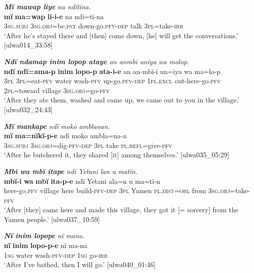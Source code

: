 \ea%
    \label{ex:complex:59}
          \textit{\textbf{Mï mawap liye} na ndïtïna.}\\
\gll    \textbf{mï}      \textbf{ma=wap}      \textbf{li-i-e}        na    ndï=tï-na\\
    3\textsc{sg.subj}  3\textsc{sg.obj}=be.\textsc{pst}  down-go.\textsc{pfv-dep}  talk  \textsc{3pl}=take-\textsc{irr}\\
\glt `After he’s stayed there and [then] come down, [he] will get the conversations.’ [ulwa014\_33:58]
\z

\ea%
    \label{ex:complex:60}
          \textit{\textbf{Ndï ndamap inim lopop ataye} an anmbi uniya wa molop.}\\
\gll    \textbf{ndï}  \textbf{ndï=ama-p}  \textbf{inim}  \textbf{lopo-p}    \textbf{ata-i-e}      an an-mbï-i      un=iya      wa    ma=lo-p\\
    3\textsc{pl}  3\textsc{pl}=eat-\textsc{pfv}  water  wash-\textsc{pfv}  up-go.\textsc{pfv-dep} \textsc{1pl.excl}    out-here-go.\textsc{pfv}  \textsc{2pl=}toward  village  3\textsc{sg.obj}=go-\textsc{pfv}\\
\glt `After they ate them, washed and came up, we came out to you in the village.’ [ulwa032\_24:43]
\z

\ea%
    \label{ex:complex:61}
          \textit{\textbf{Mï mankape} ndï moko amblanan.}\\
\gll    \textbf{mï}      \textbf{ma=nïkï-p-e}      ndï  moko  ambla=na-n\\
    3\textsc{sg.subj}  3\textsc{sg.obj}=dig{}-\textsc{pfv-dep}  \textsc{3pl}  take  \textsc{pl.refl=}give-\textsc{pfv}\\
\glt `After he butchered it, they shared [it] among themselves.’ [ulwa035\_05:29]
\z

\ea%
    \label{ex:complex:62}
          \textit{\textbf{Mbi wa mbï itape} ndï Yetani lan u matïn.}\\
\gll    \textbf{mbï-i}      \textbf{wa}    \textbf{mbï}  \textbf{ita-p-e}      ndï  Yetani  ala=n     u    ma=tï-n\\
    here-go.\textsc{pfv}  village  here  build-\textsc{pfv-dep}  \textsc{3pl}  Yamen  \textsc{pl.dist=obl}    from  \textsc{3sg.obj}=take-\textsc{pfv}\\
\glt `After [they] came here and made this village, they got it [= sorcery] from the Yamen people.’ [ulwa037\_10:59]
\z

\ea%
    \label{ex:complex:63}
         \textit{\textbf{Nï inim lopope} nï mana.}\\
\gll    \textbf{nï}  \textbf{inim}    \textbf{lopo-p-e}    nï    ma-na\\
    1\textsc{sg}  water  wash-\textsc{pfv-dep}  \textsc{1sg}  go-\textsc{irr}\\
\glt `After I’ve bathed, then I will go.’ [ulwa040\_01:46]
\z

